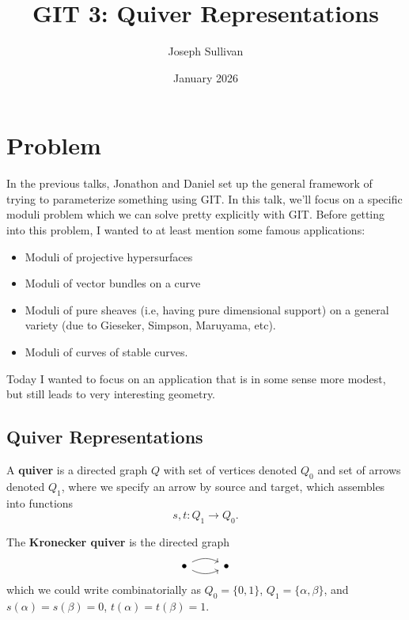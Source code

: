 \documentclass[12pt]{article}
\title{GIT 3: Quiver Representations}
\author{Joseph Sullivan}
\date{January 2026}
\begin{document}
\maketitle

\section{Problem}

In the previous talks, Jonathon and Daniel set up the general framework of trying to parameterize something using GIT. In this talk, we'll focus on a specific moduli problem which we can solve pretty explicitly with GIT. Before getting into this problem, I wanted to at least mention some famous applications:
\begin{itemize}
    \item Moduli of projective hypersurfaces
    \item Moduli of vector bundles on a curve
    \item Moduli of pure sheaves (i.e, having pure dimensional support) on a general variety (due to Gieseker, Simpson, Maruyama, etc).
    \item Moduli of curves of stable curves.
\end{itemize}

Today I wanted to focus on an application that is in some sense more modest, but still leads to very interesting geometry.

\subsection{Quiver Representations}

\begin{defn}
    A \textbf{quiver} is a directed graph $Q$ with set of vertices denoted $Q_0$ and set of arrows denoted $Q_1$, where we specify an arrow by source and target, which assembles into functions
    \[s,t: Q_1 \to Q_0.\]
\end{defn}

\begin{eg}
    The \textbf{Kronecker quiver} is the directed graph
    \[\begin{tikzcd}
        \bullet \rar[bend left=1cm] \rar[bend right=1cm] & \bullet
    \end{tikzcd}\]
    which we could write combinatorially as $Q_0=\{0,1\}$, $Q_1=\{\alpha,\beta\}$, and $s(\alpha)=s(\beta)=0$, $t(\alpha)=t(\beta)=1$.
\end{eg}
\end{document}
